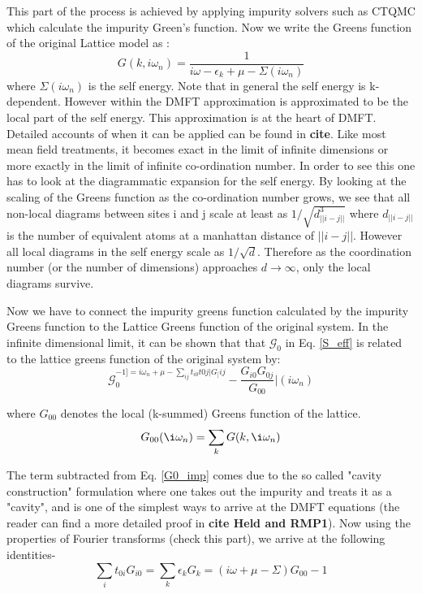 \documentclass[10pt]{ruthesis}
\begin{document}
This part of the process is achieved by applying impurity solvers such as CTQMC which calculate the impurity Green's function. Now we write the Greens function of the original Lattice model as :
\begin{equation}
G(k,i\omega_n)=\dfrac{1}{i\omega -\epsilon_k +\mu -\Sigma(i\omega_n)}
\end{equation}
 where $\Sigma(i\omega_n)$ is the self energy. Note that in general the self energy is k-dependent. However within the DMFT approximation is approximated to be the local part of the self energy. This approximation is at the heart of DMFT. Detailed accounts of when it can be applied can be found in \textbf{cite}. Like most mean field treatments, it becomes exact in the limit of infinite dimensions or more exactly in the limit of infinite co-ordination number. In order to see this one has to look at the diagrammatic expansion for the self energy. By looking at the scaling of the Greens function as the co-ordination number grows, we see that all non-local diagrams between sites i and j scale at least as $1/\sqrt{d_{||i-j||}^3}$ where $d_{||i-j||}$ is the number of equivalent atoms at a manhattan distance of $||i-j||$. However all local diagrams in the self energy scale as $1/\sqrt{d}$. Therefore as the coordination number (or the number of dimensions) approaches $d \rightarrow \infty$, only the local diagrams survive. 
 
 Now we have to connect the impurity greens function calculated by the impurity Greens function to the Lattice Greens function of the original system. In the infinite dimensional limit, it can be shown that that $\mathcal{G}_0$ in Eq. \ref{S_eff} is related to the lattice greens function of the original system by:
 \begin{equation}
  \mathcal{G}_0^{-1]= i\omega_n +\mu -\sum_{ij} t_{i0}t{0j}|G_[ij} -\dfrac{G_{i0}G_{0j}}{G_{00}}|(i \omega_n)
  \end{equation}
  
  where $G_{00}$ denotes the local (k-summed) Greens function of the lattice.
\begin{equation}
  G_{00}(\i\omega_n)=\sum_k G(k,\i\omega_n)
 \end{equation} 

  The term subtracted from Eq. \ref{G0_imp} comes due to the so called "cavity construction" formulation where one takes out the impurity and treats it as a "cavity", and is one of the simplest ways to arrive at the DMFT equations (the reader can find a more detailed proof in \textbf{cite Held and RMP1}). Now using the properties of Fourier transforms (check this part), we arrive at the following identities-
  \begin{equation}
  \sum_{i} t_{0i} G_{i0}= \sum_{k}\epsilon_k G_k= (i\omega +\mu -\Sigma)G_{00} -1
  \end{equation}
 
\end{document}
